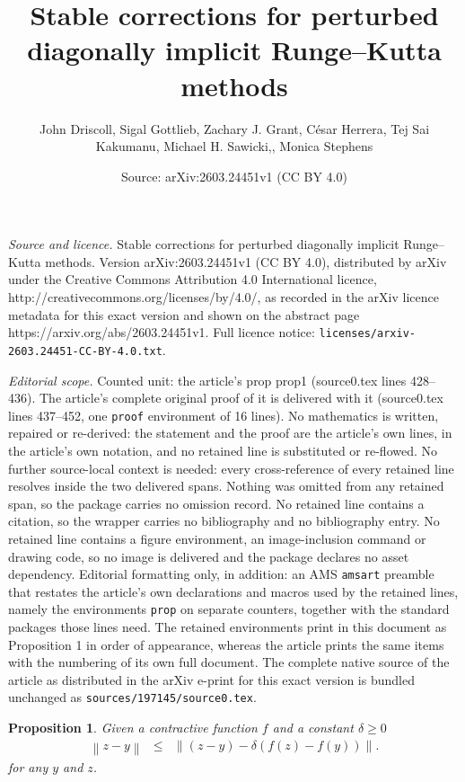 \documentclass[10pt,a4paper]{amsart}
\title{Stable corrections for perturbed diagonally implicit Runge--Kutta methods}
\author{John Driscoll, Sigal Gottlieb, Zachary J. Grant, C\'esar Herrera, Tej Sai Kakumanu, Michael H. Sawicki,, Monica Stephens}
\date{Source: arXiv:2603.24451v1 (CC BY 4.0)}
\newtheorem{prop}{Proposition}
\begin{document}
\maketitle

\noindent\emph{Source and licence.} Stable corrections for perturbed diagonally implicit Runge--Kutta methods. Version arXiv:2603.24451v1 (CC BY 4.0), distributed by arXiv under the Creative Commons Attribution 4.0 International licence, http://creativecommons.org/licenses/by/4.0/, as recorded in the arXiv licence metadata for this exact version and shown on the abstract page https://arxiv.org/abs/2603.24451v1. Full licence notice: \texttt{licenses/arxiv-2603.24451-CC-BY-4.0.txt}.\par\smallskip

\noindent\textit{Editorial scope.} Counted unit: the article's prop prop1 (source0.tex lines 428--436). The article's complete original proof of it is delivered with it (source0.tex lines 437--452, one \texttt{proof} environment of 16 lines). No mathematics is written, repaired or re-derived: the statement and the proof are the article's own lines, in the article's own notation, and no retained line is substituted or re-flowed.  No further source-local context is needed: every cross-reference of every retained line resolves inside the two delivered spans.  Nothing was omitted from any retained span, so the package carries no omission record.  No retained line contains a citation, so the wrapper carries no bibliography and no bibliography entry.  No retained line contains a figure environment, an image-inclusion command or drawing code, so no image is delivered and the package declares no asset dependency.  Editorial formatting only, in addition: an AMS \texttt{amsart} preamble that restates the article's own declarations and macros used by the retained lines, namely the environments \texttt{prop} on separate counters, together with the standard packages those lines need.  The retained environments print in this document as Proposition 1 in order of appearance, whereas the article prints the same items with the numbering of its own full document.  The complete native source of the article as distributed in the arXiv e-print for this exact version is bundled unchanged as \texttt{sources/197145/source0.tex}.
\begin{prop} \label{prop1}
Given a contractive function $f$ and a constant $\delta \geq 0 $
\begin{eqnarray} \label{ImplicitStageBound}
\left\|z - y \right\|
& \leq &
\left\|(z - y)   - \delta  \left(f(z) -  f(y)  \right) \right\|. 
\end{eqnarray}
for any   $y$ and $z$. 
\end{prop}
\end{document}
